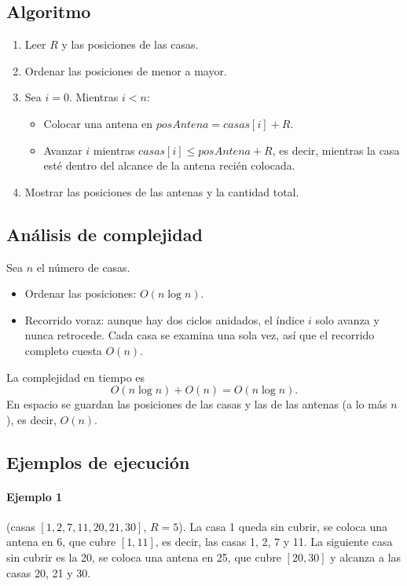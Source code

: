 \documentclass[11pt,a4paper]{article}
\begin{document}
\subsection{Algoritmo}

\begin{enumerate}
  \item Leer $R$ y las posiciones de las casas.
  \item Ordenar las posiciones de menor a mayor.
  \item Sea $i = 0$. Mientras $i < n$:
  \begin{itemize}
    \item Colocar una antena en $\textit{posAntena} = \textit{casas}[i] + R$.
    \item Avanzar $i$ mientras $\textit{casas}[i] \le \textit{posAntena} + R$, es decir, mientras la casa esté dentro del alcance de la antena recién colocada.
  \end{itemize}
  \item Mostrar las posiciones de las antenas y la cantidad total.
\end{enumerate}

\subsection{Análisis de complejidad}

Sea $n$ el número de casas.

\begin{itemize}
  \item Ordenar las posiciones: $O(n \log n)$.
  \item Recorrido voraz: aunque hay dos ciclos anidados, el índice $i$ solo avanza y nunca retrocede. Cada casa se examina una sola vez, así que el recorrido completo cuesta $O(n)$.
\end{itemize}

La complejidad en tiempo es
\[
  O(n \log n) + O(n) = O(n \log n).
\]
En espacio se guardan las posiciones de las casas y las de las antenas (a lo más $n$), es decir, $O(n)$.

\subsection{Ejemplos de ejecución}

\paragraph{Ejemplo 1} (casas $[1, 2, 7, 11, 20, 21, 30]$, $R = 5$). La casa 1 queda sin cubrir, se coloca una antena en 6, que cubre $[1, 11]$, es decir, las casas 1, 2, 7 y 11. La siguiente casa sin cubrir es la 20, se coloca una antena en 25, que cubre $[20, 30]$ y alcanza a las casas 20, 21 y 30.
\end{document}
